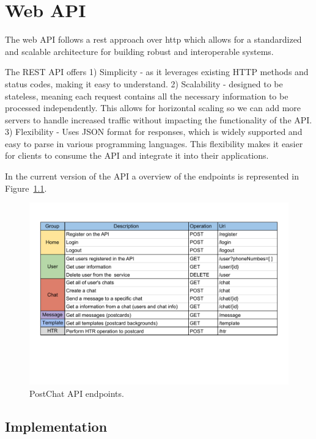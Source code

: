 \chapter{Web API} 
\label{ch:Chapter4}
\vfill \minitoc \newpage

\noindent 

The web API follows a \gls{rest} approach over \gls{http} which allows for a standardized and scalable architecture for building robust and interoperable systems.

The REST API offers 1) Simplicity - as it leverages existing HTTP methods and status codes, making it easy to understand. 2) Scalability - designed to be stateless, meaning each request contains all the necessary information to be processed independently. This allows for horizontal scaling so we can add more servers to handle increased traffic without impacting the functionality of the API. 3) Flexibility - Uses JSON format for responses, which is widely supported and easy to parse in various programming languages. This flexibility makes it easier for clients to consume the API and integrate it into their applications.

In the current version of the API a overview of the endpoints is represented in Figure~\ref{fig:Endpoints}.


\begin{figure}[!ht]
	\centering
	\includegraphics[trim={0cm 4cm 0cm 0cm}, width=1\textwidth]{./Chapter4/Figures/API_Endpoints}
	\caption{PostChat API endpoints.}
	\label{fig:Endpoints}
\end{figure}


\newpage


\section{Implementation}

